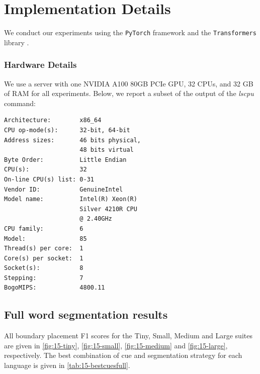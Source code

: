 \chapter{Implementation Details}\label{app:implementation}

We conduct our experiments using the \texttt{PyTorch} framework \citep{paszke-etal-2019-pytorch} and the \texttt{Transformers} library \citep{wolf-etal-2020-transformers}.

\subsection{Hardware Details}

We use a server with one NVIDIA A100 80GB PCIe GPU, 32 CPUs, and 32 GB of RAM for all experiments. Below, we report a subset of the output of the \emph{lscpu} command:

\begin{tcolorbox}[left=5pt,right=5pt,top=5pt,bottom=5pt]
\small
\begin{verbatim}
Architecture:        x86_64
CPU op-mode(s):      32-bit, 64-bit
Address sizes:       46 bits physical, 
                     48 bits virtual
Byte Order:          Little Endian
CPU(s):              32
On-line CPU(s) list: 0-31
Vendor ID:           GenuineIntel
Model name:          Intel(R) Xeon(R)
                     Silver 4210R CPU
                     @ 2.40GHz
CPU family:          6
Model:               85
Thread(s) per core:  1
Core(s) per socket:  1
Socket(s):           8
Stepping:            7
BogoMIPS:            4800.11
\end{verbatim}
\end{tcolorbox}

\section{Full word segmentation results}\label{app:fullsegresults}

All boundary placement F1 scores for the Tiny, Small, Medium and Large suites are given in \cref{fig:15-tiny}, \cref{fig:15-small}, \cref{fig:15-medium} and \cref{fig:15-large}, respectively. The best combination of cue and segmentation strategy for each language is given in \cref{tab:15-bestcuesfull}.


